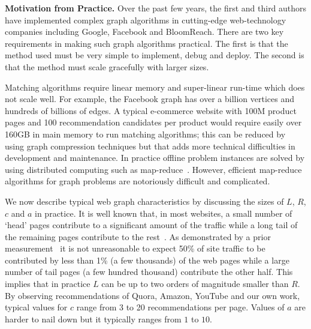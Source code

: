 \noindent
{\bf Motivation from Practice.} Over the past few years, the first and
third authors have implemented complex graph algorithms in
cutting-edge web-technology companies including Google, Facebook and
BloomReach. There are two key requirements in making such graph algorithms
practical. The first is that the method used must be very simple to
implement, debug and deploy. The second is that the method must scale
gracefully with larger sizes. \vs

Matching algorithms require linear memory and super-linear run-time
which does not scale well. For example, the Facebook graph has over a
billion vertices\cite{FacebookNodes} and hundreds of billions of edges. A typical
e-commerce website with 100M product pages and 100 recommendation candidates per
product would require easily over 160GB in main memory to run matching
algorithms; this can be reduced by using graph compression techniques but that adds more technical difficulties in development and maintenance. In practice offline problem instances are solved by using distributed computing such as map-reduce~\cite{DeanGhemawat2004}. However, efficient map-reduce algorithms for graph problems are notoriously difficult and complicated. \vs


We now describe typical web graph characteristics by discussing the sizes of $L$, $R$, $c$ and $a$ in practice. It is well known
that, in most websites,  a small number of `head' pages contribute to a
significant amount of the traffic while a long tail of the remaining
pages contribute to the rest~\cite{HubermanAdamic1999, DuDemmerBrewer2006}. As
demonstrated by a prior measurement~\cite{KumarNorrisSun2009}
it is not unreasonable to expect 50\% of site traffic to be
contributed by less than 1\% (a few thousands) of the web pages while a
large number of tail pages (a few hundred thousand) contribute
the other half. This implies that in practice $L$ can
be up to two orders of magnitude smaller than $R$.  By observing
recommendations of Quora, Amazon, YouTube and our own work, 
typical values for $c$ range from 3 to 20 recommendations per page. Values of $a$ are harder to nail down but it typically ranges from $1$ to $10$. \vs


